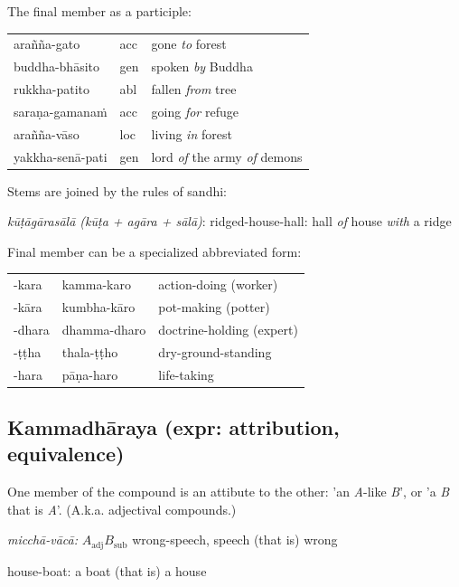 \documentclass[11pt,oneside]{memoir}
\begin{document}
The final member as a participle:

\begin{center}
\begin{tabular}{lll}
arañña-gato & acc & gone \emph{to} forest\\[0pt]
buddha-bhāsito & gen & spoken \emph{by} Buddha\\[0pt]
rukkha-patito & abl & fallen \emph{from} tree\\[0pt]
saraṇa-gamanaṁ & acc & going \emph{for} refuge\\[0pt]
arañña-vāso & loc & living \emph{in} forest\\[0pt]
yakkha-senā-pati & gen & lord \emph{of} the army \emph{of} demons\\[0pt]
\end{tabular}
\end{center}

Stems are joined by the rules of sandhi:

\emph{kūṭāgārasālā (kūṭa + agāra + sālā)}: ridged-house-hall: hall \emph{of} house \emph{with} a ridge

Final member can be a specialized abbreviated form:

\begin{center}
\begin{tabular}{lll}
-kara & kamma-karo & action-doing (worker)\\[0pt]
-kāra & kumbha-kāro & pot-making (potter)\\[0pt]
-dhara & dhamma-dharo & doctrine-holding (expert)\\[0pt]
-ṭṭha & thala-ṭṭho & dry-ground-standing\\[0pt]
-hara & pāṇa-haro & life-taking\\[0pt]
\end{tabular}
\end{center}

\subsection{Kammadhāraya (expr: attribution, equivalence)}
\label{sec:orgd10e7d5}

One member of the compound is an attibute to the other: 'an \emph{A}-like \emph{B}', or 'a
\emph{B} that is \emph{A}'. (A.k.a. adjectival compounds.)

\emph{micchā-vācā:} \(A_{\text{adj}} B_{\text{sub}}\) wrong-speech, speech (that is) wrong

house-boat: a boat (that is) a house
\end{document}
